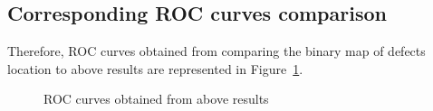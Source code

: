 \documentclass[]{spie}  %
\begin{document}
\subsection{Corresponding ROC curves comparison}
Therefore, ROC curves obtained from comparing the binary map of defects location to above results are represented in Figure~\ref{ROC_curve}.
\begin{figure}[ht]
    \centering
    \hspace{10pt}
    \caption{ROC curves obtained from above results}
    \label{ROC_curve}
\end{figure}
\end{document}
